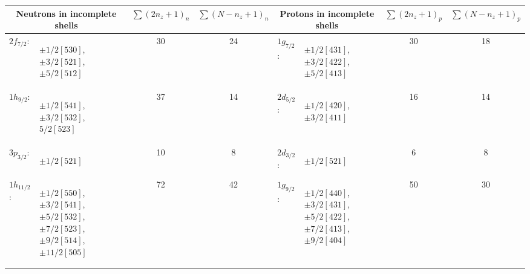 \documentclass[8pt,a4paper, twoside]{report}
\begin{document}
\begin{landscape}
\begin{table} 
\center
\begin{tabular}{|p{1.5cm}|l|c|c|p{1.5cm}|l|c|c|}
\toprule
\toprule
\multicolumn{2}{|c|}{\parbox[c][][c]{2cm}{\vspace{3pt}Neutrons in incomplete shells\vspace{3pt}}} & $\sum \left(2n_z + 1\right)_n$ & $\sum \left(N - n_z + 1\right)_n$ & \multicolumn{2}{|c|}{\parbox[c][][c]{2cm}{\vspace{3pt}Protons in incomplete shells\vspace{3pt}}} & $\sum \left(2n_z + 1\right)_p$ & $\sum \left(N - n_z + 1\right)_p$\\ 
\midrule
 $2f_{7/2}$: &\parbox[c][][l]{2cm}{\begin{flushleft}
 $\pm 1/2[530]$, $\pm 3/2[521]$, $ \pm 5/2[512]$\end{flushleft} }&  30 & 24 & $1g_{7/2}$: & \parbox[c][][c]{2cm}{\begin{flushleft}
$\pm 1/2[431]$, $\pm 3/2[422]$, $ \pm 5/2[413]$
\end{flushleft} }& 30 & 18 \\
 $1h_{9/2}$: &  \parbox[c][][c]{2cm}{\begin{flushleft}
 $\pm 1/2[541]$, $\pm 3/2[532]$, $ 5/2[523]$\end{flushleft} } & 37 & 14 & $2d_{5/2}$: & \parbox[c][][c]{2cm}{\begin{flushleft}
 $\pm 1/2[420]$, $\pm 3/2[411]$ \end{flushleft} } & 16 & 14 \\
 $3p_{3/2}$: & \parbox[c][][l]{2cm}{\begin{flushleft}
$\pm 1/2[521]$\end{flushleft}} & 10 & 8 & $2d_{3/2}$: & \parbox[c][][c]{2cm}{ \begin{flushleft}
$\pm 1/2[521]$ \end{flushleft} } & 6 & 8 \\
 $1h_{11/2}$: & \parbox[c][][c]{2cm}{\begin{flushleft}
 $\pm 1/2[550]$, $\pm 3/2[541]$, $\pm 5/2[532]$, $\pm 7/2[523]$, $\pm 9/2[514]$, $\pm 11/2 [505]$\end{flushleft}}   & 72 & 42 & $1g_{9/2}$: &  \parbox[c][][c]{2cm}{\begin{flushleft}
$\pm 1/2[440]$, $\pm 3/2[431]$, $ \pm 5/2[422]$, $\pm 7/2[413]$, $\pm 9/2[404]$ \end{flushleft} }  & 50 & 30 \\

\end{tabular}
\end{table}
\end{landscape}
\end{document}
